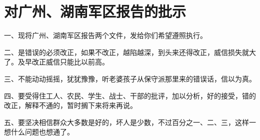 \section[对广州、湖南军区报告的批示（一九六七年）]{对广州、湖南军区报告的批示}


一、现将广州、湖南军区报告两个文件，发给你们希望遵照执行。

二、是错误的必须改正，如果不改正，越陷越深，到头来还得改正，威信损失就大了。及早改正威信只能比以前高。

三、不能动动摇摇，犹犹豫豫，听老婆孩子从保守派那里来的错误话，信以为真。

四、要受得住工人、农民、学生、战士、干部的批评，加以分析，好的接受，错的改正，解释不通的，暂时搁下来将来再说。

五、要坚决相信群众大多数是好的，坏人是少数，不过百分之一、二、三，这样一想什么问题也想通了。

